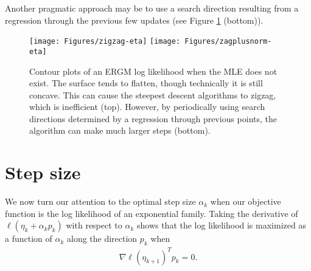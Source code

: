 Another pragmatic approach may be to use a search direction resulting from a 
regression through the previous few updates (see Figure \ref{F:zigzag} (bottom)).


\begin{figure}[!ht]
\centering
\texttt{[image: Figures/zigzag-eta]}
\texttt{[image: Figures/zagplusnorm-eta]}
\caption[Contour plots of ERGM log likelihood when MLE does not exist]{Contour plots of an ERGM log likelihood when the MLE does not exist.  The surface 
tends to flatten, though technically it is still concave.  This can cause 
the steepest descent 
algorithms to zigzag, which is inefficient (top).  However, by periodically using 
search directions 
determined by 
a regression through 
previous points, the algorithm can make much larger steps (bottom).}
\label{F:zigzag}
\end{figure}

\section{Step size} \label{S:Step size}
We now turn our attention to the optimal step size $\alpha_k$ when our objective 
function is the log likelihood of an 
exponential family.  Taking the derivative of $\ell( \eta_k + \alpha_k p_k)$ with 
respect to $\alpha_k$ shows that the 
log likelihood is maximized as a function of $\alpha_k$ along the direction $p_k$  
when 
\begin{align*}
	\nabla \ell( \eta_{k+1} )^T p_k = 0.
\end{align*}

